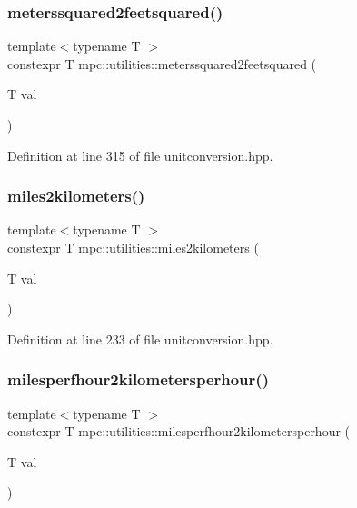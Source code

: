 \subsubsection{\texorpdfstring{meterssquared2feetsquared()}{meterssquared2feetsquared()}}
{\footnotesize\ttfamily template$<$typename T $>$ \\
constexpr T mpc\+::utilities\+::meterssquared2feetsquared (\begin{DoxyParamCaption}\item[{T}]{val }\end{DoxyParamCaption})}



Definition at line 315 of file unitconversion.\+hpp.

\mbox{\label{namespacempc_1_1utilities_a458eadeb7c7c3bb539d2d1740789b4d3}} 
\subsubsection{\texorpdfstring{miles2kilometers()}{miles2kilometers()}}
{\footnotesize\ttfamily template$<$typename T $>$ \\
constexpr T mpc\+::utilities\+::miles2kilometers (\begin{DoxyParamCaption}\item[{T}]{val }\end{DoxyParamCaption})}



Definition at line 233 of file unitconversion.\+hpp.

\mbox{\label{namespacempc_1_1utilities_af01ea239316f5eb90284cd5cf1f01919}} 
\subsubsection{\texorpdfstring{milesperfhour2kilometersperhour()}{milesperfhour2kilometersperhour()}}
{\footnotesize\ttfamily template$<$typename T $>$ \\
constexpr T mpc\+::utilities\+::milesperfhour2kilometersperhour (\begin{DoxyParamCaption}\item[{T}]{val }\end{DoxyParamCaption})}



